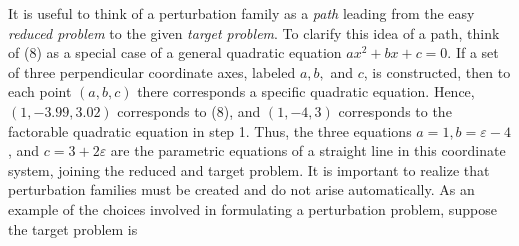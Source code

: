 \documentclass{article}
\theoremstyle{definition}
\theoremstyle{remark}
\theoremstyle{definition}
\begin{document}
    It is useful to think of a perturbation family as a \textit{path} leading from the easy \textit{reduced problem} to the given \textit{target problem}. To clarify this idea of a path, think of (8) as a special case of a general quadratic equation $ax^2+bx+c=0$. If a set of three perpendicular coordinate axes, labeled $a,b,$ and $c$, is constructed, then to each point $(a,b,c)$ there corresponds a specific quadratic equation. Hence, $(1,-3.99,3.02)$ corresponds to (8), and $(1,-4,3)$ corresponds to the factorable quadratic equation in step 1. Thus, the three equations $a=1, b=\varepsilon-4$, and $c=3+2\varepsilon$ are the parametric equations of a straight line in this coordinate system, joining the reduced and target problem. 
    \newpage
    It is important to realize that perturbation families must be created and do not arise automatically. As an example of the choices involved in formulating a perturbation problem, suppose the target problem is 
        \begin{equation}
            
        \end{equation}
    
\end{document}
